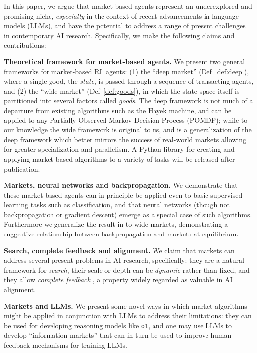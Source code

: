 In this paper, we argue that market-based agents represent an underexplored and promising niche, \emph{especially} in the context of recent advancements in language models (LLMs), and have the potential to address a range of present challenges in contemporary AI research. Specifically, we make the following claims and contributions:

\textbf{Theoretical framework for market-based agents.} We present two general frameworks for market-based RL agents: (1) the ``deep market'' (Def~\ref{def:deep}), where a single good, the \emph{state}, is passed through a sequence of transacting agents, and (2) the ``wide market'' (Def~\ref{def:goods}), in which the state space itself is partitioned into several factors called \emph{goods}. The deep framework is not much of a departure from existing algorithms such as the Hayek machine, and can be applied to any Partially Observed Markov Decision Process (POMDP); while to our knowledge the wide framework is original to us, and is a generalization of the deep framework which better mirrors the success of real-world markets allowing for greater specialization and parallelism. A Python library for creating and applying market-based algorithms to a variety of tasks will be released after publication.

\textbf{Markets, neural networks and backpropagation.} We demonstrate that these market-based agents can in principle be applied even to basic supervised learning tasks such as classification, and that neural networks (though not backpropagation or gradient descent) emerge as a special case of such algorithms. Furthermore we generalize the result in \cite{wentworthCompetitiveMarketsDistributed2018} to wide markets, demonstrating a suggestive relationship between backpropagation and markets at equilibrium.

\textbf{Search, complete feedback and alignment.} We claim that markets can address several present problems in AI research, specifically: they are a natural framework for \emph{search}, their scale or depth can be \emph{dynamic} rather than fixed, and they allow \emph{complete feedback} \cite{demskiCompleteFeedback2024}, a property widely regarded as valuable in AI alignment.

\textbf{Markets and LLMs.} We present some novel ways in which market algorithms might be applied in conjunction with LLMs to address their limitations: they can be used for developing reasoning models like \texttt{o1}, and one may use LLMs to develop ``information markets'' that can in turn be used to improve human feedback mechanisms for training LLMs.

